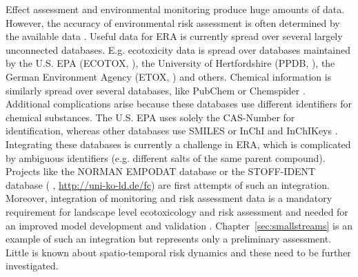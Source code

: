 Effect assessment and environmental monitoring produce huge amounts of data. 
However, the accuracy of environmental risk assessment is often determined by the available data \citep{van_den_brink_new_2016}.
Useful data for ERA is currently spread over several largely unconnected databases. 
E.g. ecotoxicity data is spread over databases maintained by the U.S. EPA (ECOTOX, \citet{u.s._epa_ecotox_2016}), the University of Hertfordshire (PPDB, \citet{lewis_international_2016}), the German Environment Agency (ETOX, \citet{umweltbundesamt_etox:_2016}) and others. 
Chemical information is similarly spread over several databases, like PubChem \citep{kim_pubchem_2016} or Chemspider \citep{pence_chemspider:_2010}.
Additional complications arise because these databases use different identifiers for chemical substances. 
The U.S. EPA \citep{u.s._epa_ecotox_2016} uses solely the CAS-Number for identification, whereas other databases use SMILES \citep{weininger_smiles._1990} or InChI and InChIKeys \citep{heller_inchi_2015}. 
Integrating these databases is currently a challenge in ERA, which is complicated by ambiguous identifiers (e.g.  different salts of the same parent compound).
Projects like the NORMAN EMPODAT database \citep{brack_norman_2012} or the STOFF-IDENT database (\citeauthor{huckele_risk_2013} \cite*{huckele_risk_2013}, \url{http://uni-ko-ld.de/fc}) are first attempts of such an integration.
Moreover, integration of monitoring and risk assessment data is a mandatory requirement for landscape level ecotoxicology and risk assessment \citep{focks_challenge:_2014} and needed for an improved model development and validation \citep{knabel_regulatory_2012, brock_aquatic_2006}. 
Chapter~\ref{sec:smallstreams} is an example of such an integration but represents only a preliminary assessment.
Little is known about spatio-temporal risk dynamics and these need to be further investigated. 

